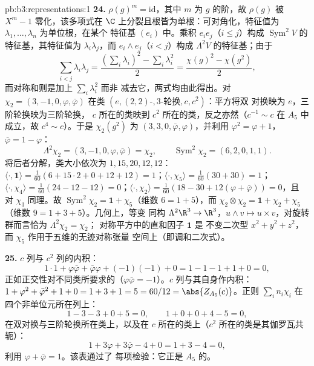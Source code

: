 \begin{solution}{pb:b3:representations:1}
\textbf{24.} $\rho(g)^m = \mathrm{id}$，其中 $m$ 为
$g$ 的阶，故 $\rho(g)$ 被 $X^m - 1$ 零化，该多项式在
$\C$ 上分裂且根皆为单根：可对角化，特征值为
$\lambda_1, \dots, \lambda_n$ 为单位根，在某个
特征基 $(e_i)$ 中。乘积 $e_ie_j$（$i \leq j$）构成
$\operatorname{Sym}^2V$ 的特征基，其特征值为
$\lambda_i\lambda_j$，而 $e_i \wedge e_j$（$i < j$）构成
$\Lambda^2V$ 的特征基；由于
\[
\sum_{i<j}\lambda_i\lambda_j
= \frac{(\sum_i\lambda_i)^2 - \sum_i\lambda_i^2}2
= \frac{\chi(g)^2 - \chi(g^2)}2,
\]
而对称和则是加上 $\sum_i\lambda_i^2$ 而非
减去它，两式均由此得出。对 $\chi_2 = (3, -1,
0, \varphi, \bar\varphi)$ 在类 $(e, (2,2)\text{-},
3\text{-轮换}, c, c^2)$：平方将双
对换映为 $e$，三阶轮换映为三阶轮换，
$c$ 所在的类映到 $c^2$ 所在的类，反之亦然（$c^{-1} \sim
c$ 在 $A_5$ 中成立，故 $c^4 \sim c$）。于是 $\chi_2(g^2)$ 为 $(3,
3, 0, \bar\varphi, \varphi)$，并利用 $\varphi^2 = \varphi
+ 1$，$\bar\varphi = 1 - \varphi$：
\[
\Lambda^2\chi_2 = (3, -1, 0, \varphi, \bar\varphi) = \chi_2,
\qquad
\operatorname{Sym}^2\chi_2 = (6, 2, 0, 1, 1) .
\]
将后者分解，类大小依次为 $1, 15, 20, 12,
12$：$\langle\cdot, \mathbf 1\rangle = \frac1{60}(6 +
15\cdot2 + 0 + 12 + 12) = 1$；$\langle\cdot, \chi_5\rangle =
\frac1{60}(30 + 30) = 1$；$\langle\cdot, \chi_4\rangle =
\frac1{60}(24 - 12 - 12) = 0$；$\langle\cdot, \chi_2\rangle =
\frac1{60}(18 - 30 + 12(\varphi + \bar\varphi)) = 0$，且
对 $\chi_3$ 同理。故 $\operatorname{Sym}^2\chi_2 =
\mathbf 1 + \chi_5$（维数 $6 = 1 + 5$），而
$\chi_2\otimes\chi_2 = \mathbf 1 + \chi_2 + \chi_5$
（维数 $9 = 1 + 3 + 5$）。几何上，等变
同构 $\Lambda^2\R^3 \to \R^3$，$u \wedge v \mapsto u
\times v$，对旋转群而言恰为 $\Lambda^2\chi_2 = \chi_2$；
对称平方中的直和因子 $\mathbf 1$ 是
不变二次型 $x^2 + y^2 + z^2$，而
$\chi_5$ 作用于五维的无迹对称张量
空间上（即调和二次式）。

\textbf{25.} $c$ 列与 $c^2$ 列的内积：
\[
1\cdot1 + \varphi\bar\varphi + \bar\varphi\varphi +
(-1)(-1) + 0 = 1 - 1 - 1 + 1 + 0 = 0,
\]
正如正交性对不同类所要求的（$\varphi
\bar\varphi = -1$）。$c$ 列与其自身作内积：$1 +
\varphi^2 + \bar\varphi^2 + 1 + 0 = 1 + 3 + 1 = 5 = 60/12 =
\abs{Z_{A_5}(c)}$。正则 $\sum_in_i\chi_i$ 在
四个非单位元所在列上：
\[
1 - 3 - 3 + 0 + 5 = 0, \qquad
1 + 0 + 0 + 4 - 5 = 0,
\]
在双对换与三阶轮换所在类上，以及在
$c$ 所在的类上（$c^2$ 所在的类是其伽罗瓦共轭）：
\[
1 + 3\varphi + 3\bar\varphi - 4 + 0 = 1 + 3 - 4 = 0,
\]
利用 $\varphi + \bar\varphi = 1$。该表通过了
每项检验：它正是 $A_5$ 的。
\end{solution}

